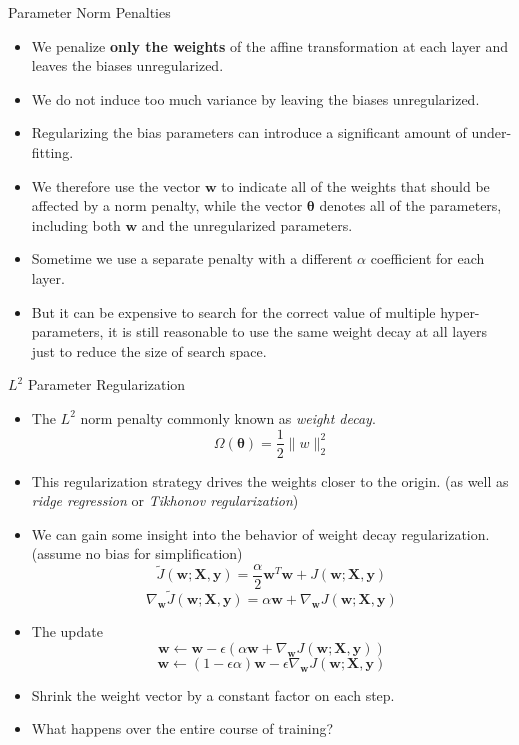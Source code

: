 \documentclass[10pt]{beamer}
\begin{document}
	\begin{frame}{Parameter Norm Penalties}
		\begin{itemize}
			\item We penalize \textbf{only the weights} of the affine transformation at each layer and leaves the biases unregularized.
			\pause
			\item We do not induce too much variance by leaving the biases unregularized.
			\pause
			\item Regularizing the bias parameters can introduce a significant amount of under-fitting.
			\pause
			\item We therefore use the vector $\bm{w}$ to indicate all of the weights that should be affected by a norm penalty, while the vector $\bm{\theta}$ denotes all of the parameters, including both $\bm{w}$ and the unregularized parameters.
			\pause
			\item Sometime we use a separate penalty with a different $\alpha$ coefficient for each layer.
			\item But it can be expensive to search for the correct value of multiple hyper-parameters, it is still reasonable to use the same weight decay at all layers just to reduce the size of search space.
		\end{itemize}
	\end{frame}
	
	\begin{frame}{$L^2$ Parameter Regularization}
		\begin{itemize}
			\item The $L^2$ norm penalty commonly known as \emph{weight decay}.
			$$\Omega(\bm{\theta})=\frac{1}{2}\lVert w\rVert^2_2$$
			
			\item This regularization strategy drives the weights closer to the origin. (as well as \emph{ridge regression} or \emph{Tikhonov regularization})
			\pause
			\item We can gain some insight into the behavior of weight decay regularization. (assume no bias for simplification)
			$$\tilde{J}(\bm{w};\bm{X},\bm{y})=\frac{\alpha}{2}\bm{w}^T\bm{w}+J(\bm{w};\bm{X},\bm{y})$$
			$$\nabla_{\bm{w}}\tilde{J}(\bm{w};\bm{X},\bm{y})=\alpha\bm{w}+\nabla_{\bm{w}}J(\bm{w};\bm{X},\bm{y})$$
			
			\pause
			\item The update
			$$\bm{w}\leftarrow\bm{w}-\epsilon(\alpha\bm{w}+\nabla_{\bm{w}}J(\bm{w};\bm{X},\bm{y}))$$
			$$\bm{w}\leftarrow(1-\epsilon\alpha)\bm{w}-\epsilon\nabla_{\bm{w}}J(\bm{w};\bm{X},\bm{y})$$

			\pause
			\item Shrink the weight vector by a constant factor on each step.
			\item What happens over the entire course of training?
		\end{itemize}
	\end{frame}
	
\end{document}
